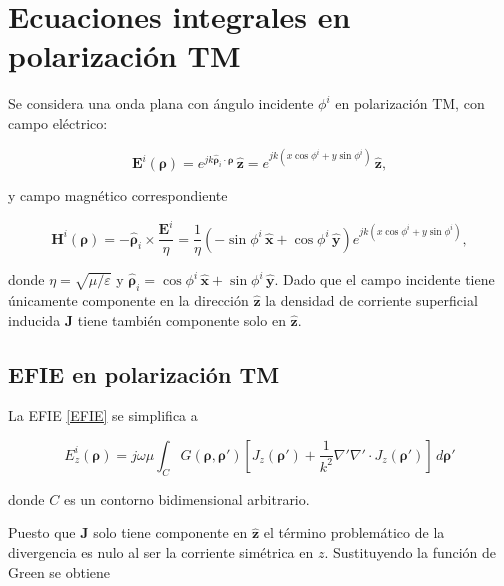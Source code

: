 \documentclass[11pt,a4paper,twoside,pdf]{article}
\numberwithin{equation}{section}
\begin{document}
 






\section{Ecuaciones integrales en polarización TM}



Se considera una onda plana con ángulo incidente $\phi^i$ en polarización TM, con campo eléctrico:

\begin{equation}
\mathbf{E}^i(\boldsymbol{\rho}) = e^{j k \hat{\boldsymbol{\rho}}_i \cdot \boldsymbol{\rho}} \, \hat{\mathbf{z}}
= e^{j k (x \cos \phi^i + y \sin \phi^i)} \, \hat{\mathbf{z}},
\label{ondaplanaincidente}
\end{equation}

y campo magnético correspondiente

\begin{equation}
\mathbf{H}^i(\boldsymbol{\rho})
= - \hat{\boldsymbol{\rho}}_i \times \frac{\mathbf{E}^i}{\eta}
= \frac{1}{\eta}
\left(
- \sin \phi^i \, \hat{\mathbf{x}}
+ \cos \phi^i \, \hat{\mathbf{y}}
\right)
e^{j k (x \cos \phi^i + y \sin \phi^i)},
\label{ondaplanaH}
\end{equation}

donde $\eta = \sqrt{\mu/\varepsilon}$ y
$\hat{\boldsymbol{\rho}}_i = \cos \phi^i \, \hat{\mathbf{x}} + \sin \phi^i \, \hat{\mathbf{y}}$.
Dado que el campo incidente tiene únicamente componente en la dirección $\hat{\mathbf{z}}$ la densidad de corriente superficial inducida $\mathbf{J}$ tiene también componente solo en $\hat{\mathbf{z}}$.

\subsection{EFIE en polarización TM}

La EFIE \ref{EFIE} se simplifica a

\begin{equation}
E_z^i(\bm{\rho})
= j \omega \mu
\int_C
G(\boldsymbol{\rho}, \boldsymbol{\rho}')
\left[
J_z(\boldsymbol{\rho}')
+ \frac{1}{k^2} \nabla' \nabla' \cdot J_z(\boldsymbol{\rho'})
\right]
\, d\boldsymbol{\rho'}
\label{ondaplana}
\end{equation}

donde $C$ es un contorno bidimensional arbitrario.

Puesto que $\boldsymbol{J}$ solo tiene componente en $\boldsymbol{\hat{z}}$ el término problemático de la divergencia es nulo al ser la corriente simétrica en $z$. Sustituyendo la función de Green se obtiene
\end{document}
